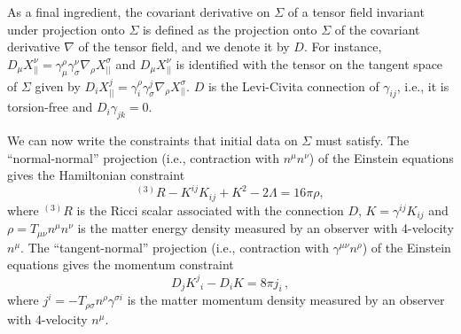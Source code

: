 \documentclass[aps,letterpaper,twocolumn,nofootinbib]{revtex4}
\numberwithin{equation}{section}
\begin{document}
As a final ingredient, the covariant derivative on $\Sigma$ of a tensor field invariant under projection onto $\Sigma$ is defined as the projection onto $\Sigma$ of the covariant derivative $\nabla$ of the tensor field, and we denote it by $D$. For instance, $D_\mu X_{||}^\nu=\gamma^\rho_\mu \gamma^\nu_\sigma \nabla_\rho X_{||}^\sigma$ and $D_\mu X_{||}^\nu$ is identified with the tensor on the tangent space of $\Sigma$ given by $D_i X_{||}^j=\gamma^\rho_i \gamma^j_\sigma \nabla_\rho X_{||}^\sigma$. $D$ is the Levi-Civita connection of $\gamma_{ij}$, i.e., it is torsion-free and $D_i\gamma_{jk}=0$.

We can now write the constraints that initial data on $\Sigma$ must satisfy. The ``normal-normal'' projection (i.e., contraction with $n^\mu n^\nu$) of the Einstein equations gives the Hamiltonian constraint
\begin{equation}
\label{eq:hamconstr}
^{(3)}R-K^{ij}K_{ij}+K^2-2\Lambda=16\pi\rho,
\end{equation}
where $^{(3)}R$ is the Ricci scalar associated with the connection $D$, $K=\gamma^{ij}K_{ij}$ and $\rho=T_{\mu\nu}n^\mu n^\nu$ is the matter energy density measured by an observer with 4-velocity $n^\mu$.
The ``tangent-normal'' projection (i.e., contraction with $\gamma^{\mu\nu} n^\rho$) of the Einstein equations gives the momentum constraint
\begin{equation}
\label{eq:momconstr}
D_j {K^j}_i-D_i K=8\pi j_i\,,
\end{equation}
where $j^i=-T_{\rho\sigma}n^\rho\gamma^{\sigma i}$ is the matter momentum density measured by an observer with 4-velocity $n^\mu$.
\end{document}
